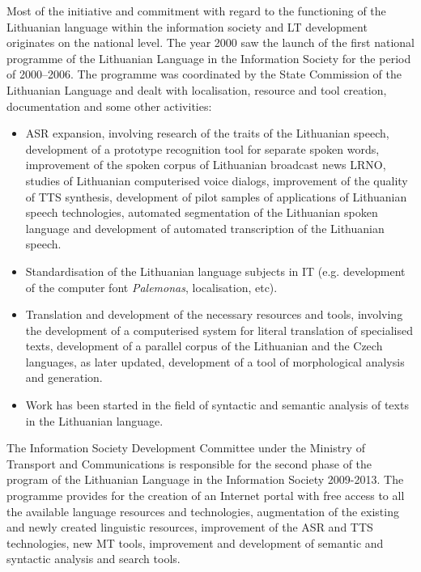 \begin{multicols}{2}
Most of the initiative and commitment with regard to the functioning of the Lithuanian language within the information society and LT development originates on the national level. The year 2000 saw the launch of the first national programme of the Lithuanian Language in the Information Society for the period of 2000–2006. The programme was coordinated by the State Commission of the Lithuanian Language and dealt with localisation, resource and tool creation, documentation and some other activities:
\begin{itemize}
      \item ASR expansion, involving research of the traits of the Lithuanian speech, development of a prototype recognition tool for separate spoken words, improvement of the spoken corpus of Lithuanian broadcast news LRNO, studies of Lithuanian computerised voice dialogs, improvement of the quality of TTS synthesis, development of pilot samples of applications of Lithuanian speech technologies, automated segmentation of the Lithuanian spoken language and development of automated transcription of the Lithuanian speech.
      \item Standardisation of the Lithuanian language subjects in IT (e.g. development of the computer font \textit{Palemonas}, localisation, etc).
      \item Translation and development of the necessary resources and tools, involving the development of a computerised system for literal translation of specialised texts, development of a parallel corpus of the Lithuanian and the Czech languages, as later updated, development of a tool of morphological analysis and generation.
      \item Work has been started in the field of syntactic and semantic analysis of texts in the Lithuanian language. 
          \end{itemize}

    The Information Society Development Committee under the Ministry of Transport and Communications is responsible for the second phase of the program of the Lithuanian Language in the Information Society 2009-2013. The programme provides for the creation of an Internet portal with free access to all the available language resources and technologies, augmentation of the existing and newly created linguistic resources, improvement of the ASR and TTS technologies, new MT tools, improvement and development of semantic and syntactic analysis and search tools.


\end{multicols}
